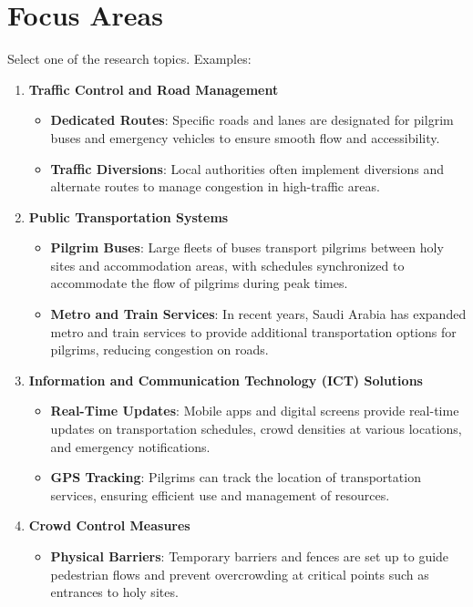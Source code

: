 \documentclass{article}
\begin{document}
\section{Focus Areas}
Select one of the research topics. Examples:
\begin{enumerate}
    \item \textbf{Traffic Control and Road Management}
    \begin{itemize}
        \item \textbf{Dedicated Routes}: Specific roads and lanes are designated for pilgrim buses and emergency vehicles to ensure smooth flow and accessibility.
        \item \textbf{Traffic Diversions}: Local authorities often implement diversions and alternate routes to manage congestion in high-traffic areas.
    \end{itemize}
    \item \textbf{Public Transportation Systems}
    \begin{itemize}
        \item \textbf{Pilgrim Buses}: Large fleets of buses transport pilgrims between holy sites and accommodation areas, with schedules synchronized to accommodate the flow of pilgrims during peak times.
        \item \textbf{Metro and Train Services}: In recent years, Saudi Arabia has expanded metro and train services to provide additional transportation options for pilgrims, reducing congestion on roads.
    \end{itemize}
    \item \textbf{Information and Communication Technology (ICT) Solutions}
    \begin{itemize}
        \item \textbf{Real-Time Updates}: Mobile apps and digital screens provide real-time updates on transportation schedules, crowd densities at various locations, and emergency notifications.
        \item \textbf{GPS Tracking}: Pilgrims can track the location of transportation services, ensuring efficient use and management of resources.
    \end{itemize}
    \item \textbf{Crowd Control Measures}
    \begin{itemize}
        \item \textbf{Physical Barriers}: Temporary barriers and fences are set up to guide pedestrian flows and prevent overcrowding at critical points such as entrances to holy sites.

\end{itemize}
\end{enumerate}
\end{document}
